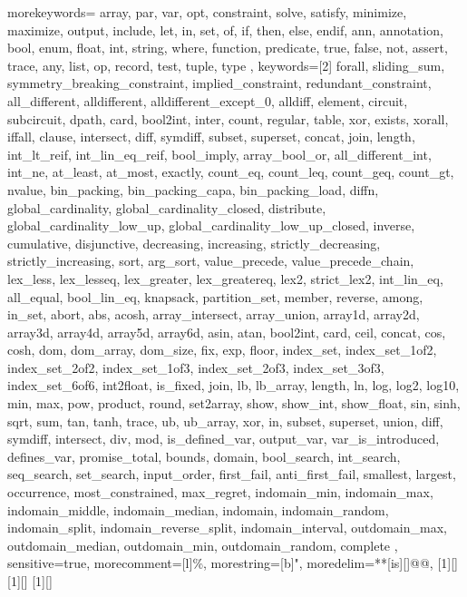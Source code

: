 {
  morekeywords={
  array, par, var, opt, constraint, solve, satisfy, minimize,
  maximize, output, include, let, in, set, of, if, then, else, endif,
  ann, annotation, bool, enum, float, int, string, where, function,
  predicate, true, false, not, assert, trace,
  any, list, op, record, test, tuple, type
  },
  keywords=[2]{
  forall, sliding_sum, symmetry_breaking_constraint,
  implied_constraint, redundant_constraint, all_different,
  alldifferent, alldifferent_except_0, alldiff, element, circuit,
  subcircuit, dpath, card, bool2int, inter, count, regular, table, xor,
  exists, xorall, iffall, clause, intersect, diff, symdiff, subset,
  superset, concat, join, length, int_lt_reif, int_lin_eq_reif,
  bool_imply, array_bool_or, all_different_int, int_ne, at_least,
  at_most, exactly, count_eq, count_leq, count_geq, count_gt, nvalue,
  bin_packing, bin_packing_capa, bin_packing_load, diffn,
  global_cardinality, global_cardinality_closed, distribute,
  global_cardinality_low_up, global_cardinality_low_up_closed,
  inverse, cumulative, disjunctive, decreasing, increasing,
  strictly_decreasing, strictly_increasing, sort,
  arg_sort, value_precede, value_precede_chain, lex_less, lex_lesseq,
  lex_greater, lex_greatereq, lex2, strict_lex2, int_lin_eq, all_equal,
  bool_lin_eq, knapsack, partition_set, member, reverse, among, in_set,
  abort, abs, acosh, array_intersect, array_union, array1d, array2d,
  array3d, array4d, array5d, array6d, asin, atan, bool2int, card,
  ceil, concat, cos, cosh, dom, dom_array, dom_size, fix, exp, floor,
  index_set, index_set_1of2, index_set_2of2, index_set_1of3,
  index_set_2of3, index_set_3of3, index_set_6of6, int2float, is_fixed,
  join, lb, lb_array, length, ln, log, log2, log10, min, max, pow,
  product, round, set2array, show, show_int, show_float, sin, sinh,
  sqrt, sum, tan, tanh, trace, ub, ub_array, xor, in, subset,
  superset, union, diff, symdiff, intersect, div, mod,
  is_defined_var, output_var, var_is_introduced, defines_var,
  promise_total, bounds, domain, bool_search, int_search, seq_search,
  set_search, input_order, first_fail, anti_first_fail, smallest,
  largest, occurrence, most_constrained, max_regret, indomain_min,
  indomain_max, indomain_middle, indomain_median, indomain,
  indomain_random, indomain_split, indomain_reverse_split,
  indomain_interval, outdomain_max, outdomain_median, outdomain_min,
  outdomain_random, complete
  },
  sensitive=true,
  morecomment=[l]{\%},
  morestring=[b]",
  moredelim=**[is][\color{Melon}]{@}{@},
}
[1][]{\lstset{language=Mzn,style=mzn,#1}}{}
[1][]{\lstset{language=Mzn,style=mzn,style=nonumbers,#1}}{}
[1][]{\noindent\lstset{language=Mzn,style=mzn,style=nonumbers,#1}\minipage{\textwidth}}{\endminipage}

